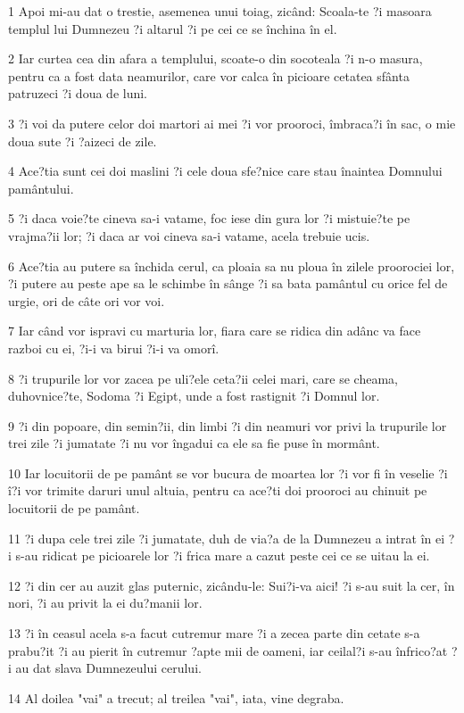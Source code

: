 \par 1 Apoi mi-au dat o trestie, asemenea unui toiag, zicând: Scoala-te ?i masoara templul lui Dumnezeu ?i altarul ?i pe cei ce se închina în el.
\par 2 Iar curtea cea din afara a templului, scoate-o din socoteala ?i n-o masura, pentru ca a fost data neamurilor, care vor calca în picioare cetatea sfânta patruzeci ?i doua de luni.
\par 3 ?i voi da putere celor doi martori ai mei ?i vor prooroci, îmbraca?i în sac, o mie doua sute ?i ?aizeci de zile.
\par 4 Ace?tia sunt cei doi maslini ?i cele doua sfe?nice care stau înaintea Domnului pamântului.
\par 5 ?i daca voie?te cineva sa-i vatame, foc iese din gura lor ?i mistuie?te pe vrajma?ii lor; ?i daca ar voi cineva sa-i vatame, acela trebuie ucis.
\par 6 Ace?tia au putere sa închida cerul, ca ploaia sa nu ploua în zilele proorociei lor, ?i putere au peste ape sa le schimbe în sânge ?i sa bata pamântul cu orice fel de urgie, ori de câte ori vor voi.
\par 7 Iar când vor ispravi cu marturia lor, fiara care se ridica din adânc va face razboi cu ei, ?i-i va birui ?i-i va omorî.
\par 8 ?i trupurile lor vor zacea pe uli?ele ceta?ii celei mari, care se cheama, duhovnice?te, Sodoma ?i Egipt, unde a fost rastignit ?i Domnul lor.
\par 9 ?i din popoare, din semin?ii, din limbi ?i din neamuri vor privi la trupurile lor trei zile ?i jumatate ?i nu vor îngadui ca ele sa fie puse în mormânt.
\par 10 Iar locuitorii de pe pamânt se vor bucura de moartea lor ?i vor fi în veselie ?i î?i vor trimite daruri unul altuia, pentru ca ace?ti doi prooroci au chinuit pe locuitorii de pe pamânt.
\par 11 ?i dupa cele trei zile ?i jumatate, duh de via?a de la Dumnezeu a intrat în ei ?i s-au ridicat pe picioarele lor ?i frica mare a cazut peste cei ce se uitau la ei.
\par 12 ?i din cer au auzit glas puternic, zicându-le: Sui?i-va aici! ?i s-au suit la cer, în nori, ?i au privit la ei du?manii lor.
\par 13 ?i în ceasul acela s-a facut cutremur mare ?i a zecea parte din cetate s-a prabu?it ?i au pierit în cutremur ?apte mii de oameni, iar ceilal?i s-au înfrico?at ?i au dat slava Dumnezeului cerului.
\par 14 Al doilea "vai" a trecut; al treilea "vai", iata, vine degraba.
